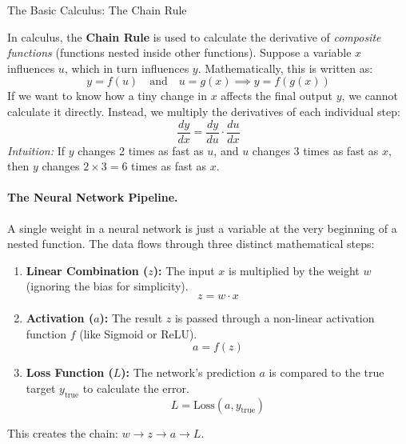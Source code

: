 \documentclass[11pt]{article}
\theoremstyle{smallexample}
\begin{document}
\begin{defbox}{The Basic Calculus: The Chain Rule}

In calculus, the \textbf{Chain Rule} is used to calculate the derivative of \textit{composite functions} (functions nested inside other functions).  Suppose a variable $x$ influences $u$, which in turn influences $y$. Mathematically, this is written as:
\begin{equation*}
y = f(u) \quad \text{and} \quad u = g(x) \implies y = f(g(x))
\end{equation*}
If we want to know how a tiny change in $x$ affects the final output $y$, we cannot calculate it directly. Instead, we multiply the derivatives of each individual step:
\begin{equation*}
\frac{dy}{dx} = \frac{dy}{du} \cdot \frac{du}{dx}
\end{equation*}
\textit{Intuition:} If $y$ changes 2 times as fast as $u$, and $u$ changes 3 times as fast as $x$, then $y$ changes $2 \times 3 = 6$ times as fast as $x$.

\paragraph*{The Neural Network Pipeline.}
A single weight in a neural network is just a variable at the very beginning of a nested function. The data flows through three distinct mathematical steps:
\begin{enumerate}
    \item \textbf{Linear Combination ($z$):} The input $x$ is multiplied by the weight $w$ (ignoring the bias for simplicity).
    \begin{equation*}
        z = w \cdot x
    \end{equation*}
    \item \textbf{Activation ($a$):} The result $z$ is passed through a non-linear activation function $f$ (like Sigmoid or ReLU).
    \begin{equation*}
        a = f(z)
    \end{equation*}
    \item \textbf{Loss Function ($L$):} The network's prediction $a$ is compared to the true target $y_{\text{true}}$ to calculate the error.
    \begin{equation*}
        L = \text{Loss}(a, y_{\text{true}})
    \end{equation*}
\end{enumerate}
This creates the chain: $w \rightarrow z \rightarrow a \rightarrow L$.


\end{defbox}
\end{document}

